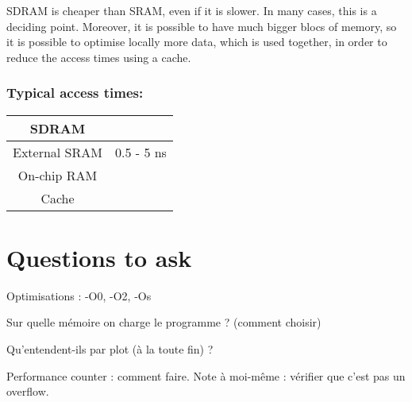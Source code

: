 \documentclass[a4paper,10pt]{article}
\begin{document}
SDRAM is cheaper than SRAM, even if it is slower. In many cases, this is a deciding point. Moreover, it is possible to have much bigger blocs of memory, so it is possible to optimise locally more data, which is used together, in order to reduce the access times using a cache. 

\subsubsection{Typical access times:}

\begin{tabular}{|c|c|}
   \hline
   SDRAM & \\
   \hline
   External SRAM & 0.5 - 5 ns\\
   \hline
   On-chip RAM & \\
   \hline
   Cache & \\
   \hline
\end{tabular}


\section{Questions to ask}

Optimisations : -O0, -O2, -Os

Sur quelle mémoire on charge le programme ? (comment choisir)

Qu'entendent-ils par plot (à la toute fin) ?

Performance counter : comment faire. Note à moi-même : vérifier que c'est pas un overflow.







    
\end{document}
